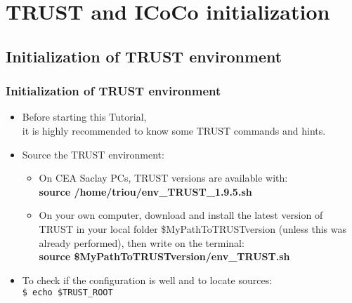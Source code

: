 \documentclass[10pt, hyperref={unicode=true,pdfusetitle, bookmarks=true,bookmarksnumbered=false,bookmarksopen=false, breaklinks=false,pdfborder={0 0 1},backref=true,colorlinks=true,linkcolor=darkblue,pageanchor, urlcolor=darkblue}]{beamer}
\begin{document}



\section{{\bf{TRUST and ICoCo initialization}}}
\begin{frame}
\end{frame}

\begin{frame}
\subsection{Initialization of TRUST environment}

\frametitle{Initialization of TRUST environment}
\begin{block}{}

\begin{itemize}
\item Before starting this Tutorial, \\
 it is highly recommended to know some TRUST commands and hints.\vspace{0.2cm}
 \item Source the TRUST environment:\\
\begin{itemize}
\item On CEA Saclay PCs, TRUST versions are available with:\\
\textbf{source /home/triou/env\_TRUST\_1.9.5.sh}
\vspace{0.2cm}
\item On your own computer, download and install the latest version of TRUST in your local folder \$MyPathToTRUSTversion (unless this was already performed), then write on the terminal:\\
\textbf{source  \$MyPathToTRUSTversion/env\_TRUST.sh}
\vspace{0.2cm}
\end{itemize}

\item To check if the configuration is well and to locate sources:\\
\texttt{\$ echo \$TRUST\_ROOT}
\end{itemize}
\end{block}
\end{frame}
\end{document}

